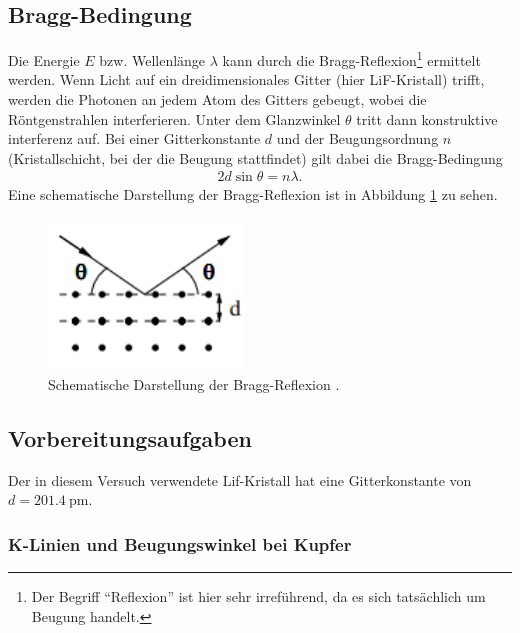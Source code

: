\subsection{Bragg-Bedingung}
Die Energie $E$ bzw. Wellenlänge $\lambda$ kann durch die Bragg-Reflexion\footnote[2]{Der Begriff \enquote{Reflexion} ist hier sehr irreführend, da es sich tatsächlich um Beugung handelt.}
ermittelt werden.
Wenn Licht auf ein dreidimensionales Gitter (hier LiF-Kristall) trifft,
werden die Photonen an jedem Atom des Gitters gebeugt, wobei die Röntgenstrahlen interferieren.
Unter dem Glanzwinkel $\theta$ tritt dann konstruktive interferenz auf.
Bei einer Gitterkonstante $d$ und der Beugungsordnung $n$ (Kristallschicht, bei der die Beugung stattfindet) gilt dabei die Bragg-Bedingung
\begin{align}
    2 d \sin \theta = n \lambda.
    \label{eq:bragg}
\end{align}
Eine schematische Darstellung der Bragg-Reflexion ist in Abbildung \ref{fig:bragg} zu sehen.

\begin{figure}[H]
    \centering
    \includegraphics[height = 4cm]{Abbildungen/bragg.png}
    \caption[]{Schematische Darstellung der Bragg-Reflexion \cite[]{man:v602}.}
    \label{fig:bragg}
\end{figure}


\subsection{Vorbereitungsaufgaben}
Der in diesem Versuch verwendete Lif-Kristall hat eine Gitterkonstante von $d = \qty[]{201.4}{\pico\meter}$.

\subsubsection[]{K-Linien und Beugungswinkel bei Kupfer}
%
%
